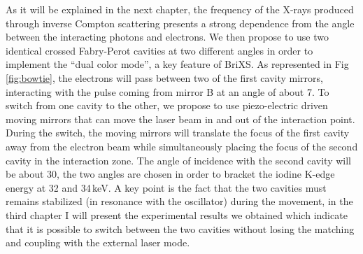As it will be explained in the next chapter, the frequency of the X-rays produced through inverse Compton scattering presents a strong dependence from the angle between the interacting photons and electrons. We then propose to use two identical crossed Fabry-Perot cavities at two different angles in order to implement the ``dual color mode'', a key feature of BriXS. As represented in Fig \ref{fig:bowtie}, the electrons will pass between two of the first cavity mirrors, interacting with the pulse coming from mirror B at an angle of about 7\degree. To switch from one cavity to the other, we propose to use piezo-electric driven moving mirrors that can move the laser beam in and out of the interaction point. During the switch, the moving mirrors will translate the focus of the first cavity away from the electron beam while simultaneously placing the focus of the second cavity in the interaction zone. The angle of incidence with the second cavity will be about 30\degree, the two angles are chosen in order to bracket the iodine K-edge energy at 32 and 34\,keV. A key point is the fact that the two cavities must remains stabilized (in resonance with the oscillator) during the movement, in the third chapter I will present the experimental results we obtained which indicate that it is possible to switch between the two cavities without losing the matching and coupling with the external laser mode.

